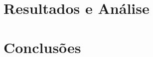 \documentclass[twoside,a4paper,12pt]{report}
\begin{document}


\chapter{Resultados e Análise}
\chapter{Conclusões}






%

\end{document}
